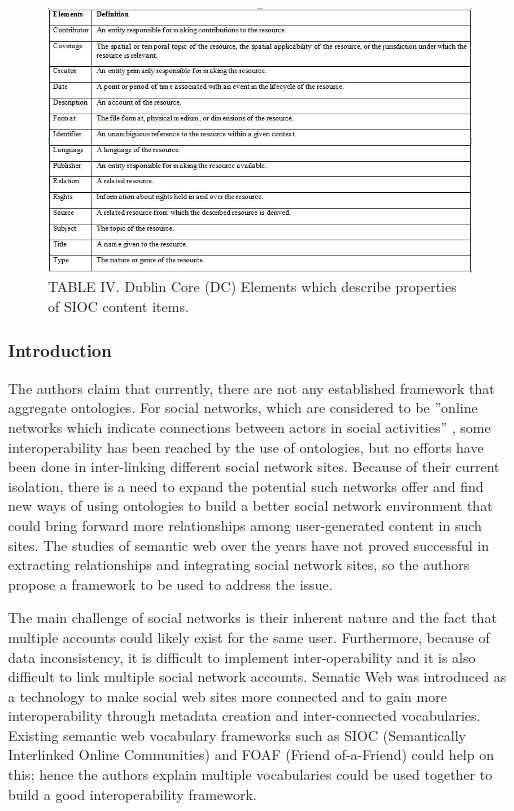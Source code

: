 \documentclass[10pt,journal,compsoc]{IEEEtran}
\begin{document}
\begin{figure}[t]
\begin{center}
\includegraphics[width=8in]{DanielaTable4.JPG}  
\caption*{TABLE IV. Dublin Core (DC) Elements which describe properties of SIOC content items.}     
\label{fig1}
\end{center}
\end{figure}



\subsubsection{Introduction}
The authors claim that currently, there are not any established framework that aggregate ontologies. For social networks, which are considered to be ''online networks which indicate connections between actors in social activities'' \cite{6190504}, some interoperability has been reached by the use of ontologies, but no efforts have been done in inter-linking different social network sites. Because of their current isolation, there is a need to expand the potential such networks offer and find new ways of using ontologies to build a better social network environment that could bring forward more relationships among user-generated content in such sites. The studies of semantic web over the years have not proved successful in extracting relationships and integrating social network sites, so the authors propose a framework to be used to address the issue. 



The main challenge of social networks is their inherent nature and the fact that multiple accounts could likely exist for the same user. Furthermore, because of data inconsistency, it is difficult to implement inter-operability and it is also difficult to link multiple social network accounts. Sematic Web was introduced as a technology to make social web sites more connected and to gain more interoperability through metadata creation and inter-connected vocabularies. Existing semantic web vocabulary frameworks such as SIOC (Semantically Interlinked Online Communities) and FOAF (Friend of-a-Friend) could help on this; hence the authors explain multiple vocabularies could be used together to build a good interoperability framework. 
\end{document}
